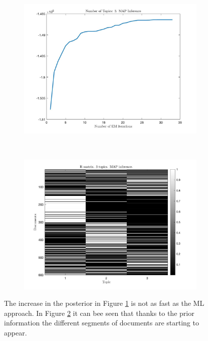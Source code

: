 \documentclass[12pt]{article}
\begin{document}
\begin{figure}[h]
	\centering
	\begin{subfigure}{0.4\textwidth}
		\includegraphics[width=\textwidth]{images/MAP/Q_map_3_topics_alpha11.jpg}
		\caption{}
		\label{fig:Q_MAP_1.1}
	\end{subfigure}
	~	
	\begin{subfigure}{0.4\textwidth}
		\includegraphics[width=\textwidth]{images/MAP/R_map_3_topics_alpha11.jpg}
		\caption{}
		\label{fig:R_MAP_1.1}
	\end{subfigure}
	\caption{The increase in the posterior in Figure  \ref{fig:Q_MAP_1.1} is not as fast as the ML approach. In Figure \ref{fig:R_MAP_1.1} it can bee seen that thanks to the prior information the different segments of documents are starting to appear.}
	\label{fig:MAP_1.1}
\end{figure}
\end{document}
